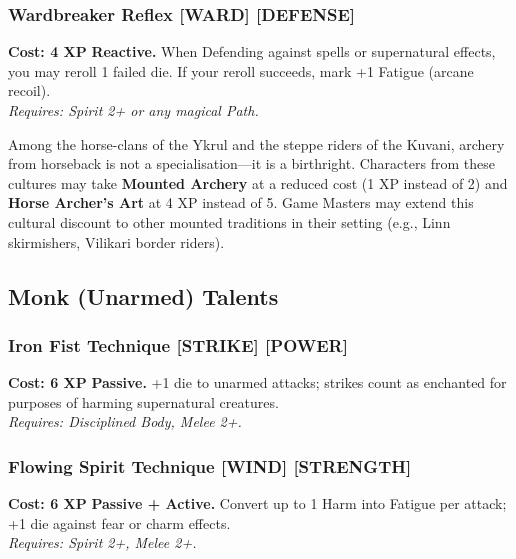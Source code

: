\subsubsection*{Wardbreaker Reflex \textnormal{[WARD] [DEFENSE]}}
\label{talent:wardbreaker-reflex}
\textbf{Cost: 4 XP} \textbf{Reactive.} When Defending against spells or supernatural effects, you may reroll 1 failed die. If your reroll succeeds, mark +1 Fatigue (arcane recoil). \\
\textit{Requires: Spirit 2+ or any magical Path.}

\begin{tcolorbox}[colback=blue!5!white,colframe=blue!75!black,title=\textbf{Mounted Combat Traditions},breakable]
Among the horse-clans of the Ykrul and the steppe riders of the Kuvani, archery from horseback is not a specialisation---it is a birthright. Characters from these cultures may take \textbf{Mounted Archery} at a reduced cost (1 XP instead of 2) and \textbf{Horse Archer's Art} at 4 XP instead of 5. Game Masters may extend this cultural discount to other mounted traditions in their setting (e.g., Linn skirmishers, Vilikari border riders).
\end{tcolorbox}

\subsection*{Monk (Unarmed) Talents}
\label{sec:major-monk}

\subsubsection*{Iron Fist Technique \textnormal{[STRIKE] [POWER]}}
\label{talent:iron-fist-technique}
\textbf{Cost: 6 XP} \textbf{Passive.} +1 die to unarmed attacks; strikes count as enchanted for purposes of harming supernatural creatures. \\
\textit{Requires: Disciplined Body, Melee 2+.}

\subsubsection*{Flowing Spirit Technique \textnormal{[WIND] [STRENGTH]}}
\label{talent:flowing-spirit-technique}
\textbf{Cost: 6 XP} \textbf{Passive + Active.} Convert up to 1 Harm into Fatigue per attack; +1 die against fear or charm effects. \\
\textit{Requires: Spirit 2+, Melee 2+.}

